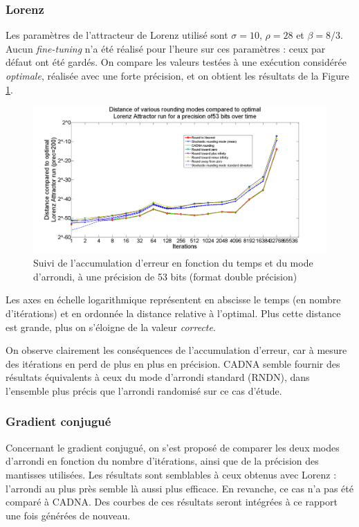 \documentclass[a4paper,11pt]{article}
\begin{document}
\subsubsection{Lorenz}
Les paramètres de l'attracteur de Lorenz utilisé sont $\sigma = 10$, $\rho = 28$ et $\beta = 8/3$. Aucun \textit{fine-tuning} n'a été réalisé pour l'heure sur ces paramètres : ceux par défaut ont été gardés.
On compare les valeurs testées à une exécution considérée \textit{optimale}, réalisée avec une forte précision, et on obtient les résultats de la Figure \ref{Lorenz}.\\
\begin{figure}[h]
	\begin{center}
		\includegraphics[width=15cm]{distance_prec=53_logx}
		\caption{Suivi de l'accumulation d'erreur en fonction du temps et du mode d'arrondi, à une précision de 53 bits (format double précision)}
		\label{Lorenz}
	\end{center}
\end{figure}
Les axes en échelle logarithmique représentent en abscisse le temps (en nombre d'itérations) et en ordonnée la distance relative à l’optimal. Plus cette distance est grande, plus on s'éloigne de la valeur \textit{correcte}.

On observe clairement les conséquences de l’accumulation d’erreur, car à mesure des itérations en perd de plus en plus en précision. 
CADNA semble fournir des résultats équivalents à ceux du mode d’arrondi standard (RNDN), dans l’ensemble plus précis que l’arrondi randomisé sur ce cas d'étude.

\subsubsection{Gradient conjugué}
Concernant le gradient conjugué, on s'est proposé de comparer les deux modes d’arrondi en fonction du nombre d’itérations, ainsi que de la précision des mantisses utilisées. Les résultats sont semblables à ceux obtenus avec Lorenz : l'arrondi au plus près semble là aussi plus efficace. En revanche, ce cas n'a pas été comparé à CADNA.
Des courbes de ces résultats seront intégrées à ce rapport une fois générées de nouveau.
\end{document}
